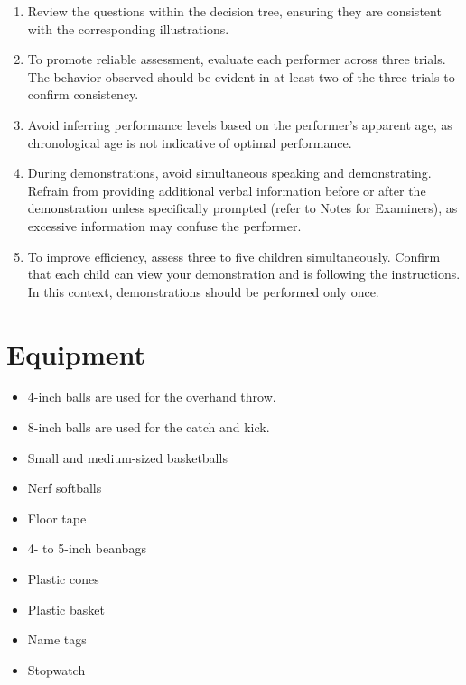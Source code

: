 \documentclass[
  letterpaper,
  DIV=11,
  numbers=noendperiod]{scrreprt}
\providecommand{\tightlist}{%
  \setlength{\itemsep}{0pt}\setlength{\parskip}{0pt}}
\begin{document}
\begin{enumerate}
\def\labelenumi{\arabic{enumi}.}
\tightlist
\item
  Review the questions within the decision tree, ensuring they are
  consistent with the corresponding illustrations.
\item
  To promote reliable assessment, evaluate each performer across three
  trials. The behavior observed should be evident in at least two of the
  three trials to confirm consistency.
\item
  Avoid inferring performance levels based on the performer's apparent
  age, as chronological age is not indicative of optimal performance.
\item
  During demonstrations, avoid simultaneous speaking and demonstrating.
  Refrain from providing additional verbal information before or after
  the demonstration unless specifically prompted (refer to Notes for
  Examiners), as excessive information may confuse the performer.
\item
  To improve efficiency, assess three to five children simultaneously.
  Confirm that each child can view your demonstration and is following
  the instructions. In this context, demonstrations should be performed
  only once.
\end{enumerate}


\chapter{Equipment}\label{equipment}

\begin{itemize}
\tightlist
\item
  4-inch balls are used for the overhand throw.
\item
  8-inch balls are used for the catch and kick.
\item
  Small and medium-sized basketballs
\item
  Nerf softballs
\item
  Floor tape
\item
  4- to 5-inch beanbags
\item
  Plastic cones
\item
  Plastic basket
\item
  Name tags
\item
  Stopwatch
\end{itemize}

\end{document}
